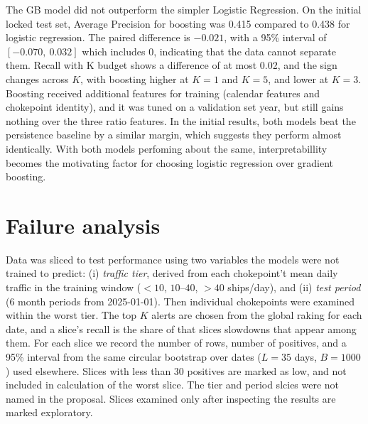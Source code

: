 \documentclass[11pt]{article}
\begin{document}
The GB model did not outperform the simpler Logistic Regression. On the initial locked test set, Average Precision for boosting was 0.415 compared to 0.438 for logistic regression. The paired difference is $-0.021$, with a 95\% interval of $[-0.070, \ 0.032]$ which includes 0, indicating that the data cannot separate them. Recall with K budget shows a difference of at most 0.02, and the sign changes across $K$, with boosting higher at $K=1$ and $K=5$, and lower at $K=3$. Boosting received additional features for training (calendar features and chokepoint identity), and it was tuned on a validation set year, but still gains nothing over the three ratio features. In the initial results, both models beat the persistence baseline by a similar margin, which suggests they perform almost identically. With both models perfoming about the same, interpretabillity becomes the motivating factor for choosing logistic regression over gradient boosting. 
\section{Failure analysis}  %
Data was sliced to test performance using two variables the models were not trained to predict: (i) \emph{traffic tier}, derived from each chokepoint't mean daily traffic in the training window ($<10$, $10$--$40$, $>40$ ships/day), and (ii) \emph{test period} (6 month periods from 2025-01-01). Then individual chokepoints were examined within the worst tier. The top $K$ alerts are chosen from the global raking for each date, and a slice's recall is the share of that slices slowdowns that appear among them. For each slice we record the number of rows, number of positives, and a 95\% interval from the same circular bootstrap over dates ($L=35$ days, $B=1000$) used elsewhere. Slices with less than 30 positives are marked as low, and not included in calculation of the worst slice. The tier and period slcies were not named in the proposal. Slices examined only after inspecting the results are marked exploratory. 
\end{document}
